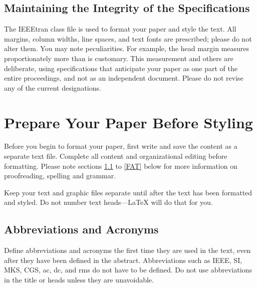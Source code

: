 \documentclass[conference]{IEEEtran}
\begin{document}
\begin{figure}[!htbp]
{
    } 
\end{figure}   


\subsection{Maintaining the Integrity of the Specifications}

The IEEEtran class file is used to format your paper and style the text. All margins, 
column widths, line spaces, and text fonts are prescribed; please do not 
alter them. You may note peculiarities. For example, the head margin
measures proportionately more than is customary. This measurement 
and others are deliberate, using specifications that anticipate your paper 
as one part of the entire proceedings, and not as an independent document. 
Please do not revise any of the current designations.

\section{Prepare Your Paper Before Styling}
Before you begin to format your paper, first write and save the content as a 
separate text file. Complete all content and organizational editing before 
formatting. Please note sections \ref{AA} to \ref{FAT} below for more information on 
proofreading, spelling and grammar.

Keep your text and graphic files separate until after the text has been 
formatted and styled. Do not number text heads---{\LaTeX} will do that 
for you.

\subsection{Abbreviations and Acronyms}\label{AA}
Define abbreviations and acronyms the first time they are used in the text, 
even after they have been defined in the abstract. Abbreviations such as 
IEEE, SI, MKS, CGS, ac, dc, and rms do not have to be defined. Do not use 
abbreviations in the title or heads unless they are unavoidable.
\end{document}
